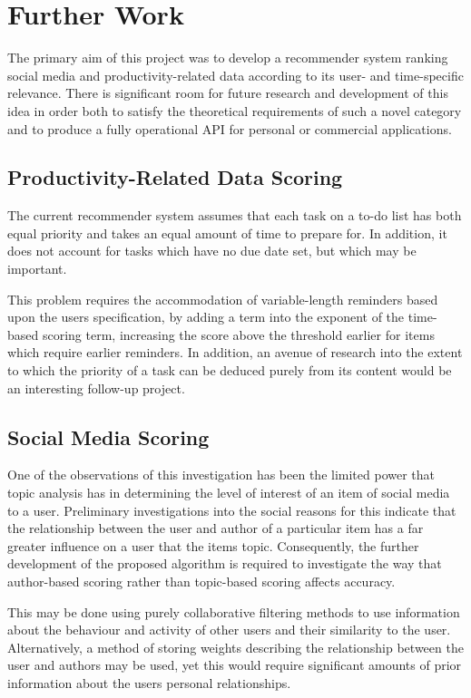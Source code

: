 \chapter{Further Work}

The primary aim of this project was to develop a recommender system ranking social media and productivity-related data according to its user- and time-specific relevance. There is significant room for future research and development of this idea in order both to satisfy the theoretical requirements of such a novel category  and to produce a fully operational API for personal or commercial applications. 

\section{Productivity-Related Data Scoring}

The current recommender system assumes that each task on a to-do list has both equal priority and takes an equal amount of time to prepare for. In addition, it does not account for tasks which have no due date set, but which may be important.

This problem requires the accommodation of variable-length reminders based upon the users specification, by adding a term into the exponent of the time-based scoring term, increasing the score above the threshold earlier for items which require earlier reminders. In addition, an avenue of research into the extent to which the priority of a task can be deduced purely from its content would be an interesting follow-up project.

\section{Social Media Scoring}

One of the observations of this investigation has been the limited power that topic analysis has in determining the level of interest of an item of social media to a user. Preliminary investigations into the social reasons for this indicate that the relationship between the user and author of a particular item has a far greater influence on a user that the items topic. Consequently, the further development of the proposed algorithm is required to investigate the way that author-based scoring rather than topic-based scoring affects accuracy. 

This may be done using purely collaborative filtering methods to use information about the behaviour and activity of other users and their similarity to the user. Alternatively, a method of storing weights describing the relationship between the user and authors may be used, yet this would require significant amounts of prior information about the users personal relationships. 

